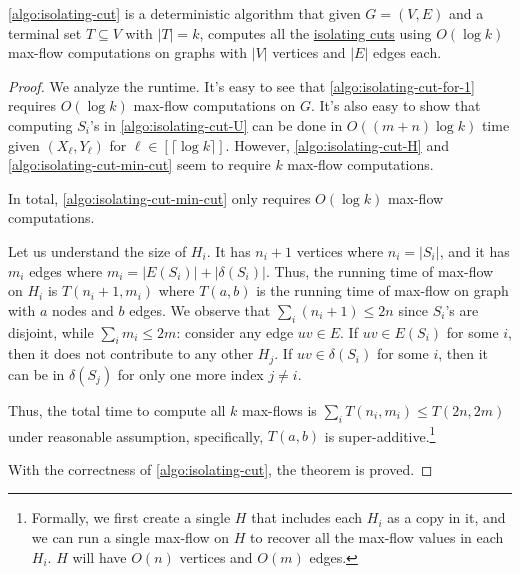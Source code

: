 \begin{theorem}\label{thm:isolating-min-cut}
	\autoref{algo:isolating-cut} is a deterministic algorithm that given \(G = (V, E)\) and a terminal set \(T \subseteq V\) with \(\lvert T \rvert = k\), computes all the \hyperref[prb:isolating-cut]{isolating cuts} using \(O(\log k)\) max-flow computations on graphs with \(\lvert V \rvert \) vertices and \(\lvert E \rvert \) edges each.
\end{theorem}
\begin{proof}
	We analyze the runtime. It's easy to see that \autoref{algo:isolating-cut-for-1} requires \(O(\log k)\) max-flow computations on \(G\). It's also easy to show that computing \(S_i\)'s in \autoref{algo:isolating-cut-U} can be done in \(O((m+n) \log k)\) time given \((X_{\ell } , Y_{\ell } )\) for \(\ell \in [\lceil \log k \rceil ]\). However, \autoref{algo:isolating-cut-H} and \autoref{algo:isolating-cut-min-cut} seem to require \(k\) max-flow computations.

	\begin{claim}
		In total, \autoref{algo:isolating-cut-min-cut} only requires \(O(\log k)\) max-flow computations.
	\end{claim}
	\begin{explanation}
		Let us understand the size of \(H_i\). It has \(n_i + 1\) vertices where \(n_i = \lvert S_i \rvert \), and it has \(m_i\) edges where \(m_i = \lvert E(S_i) \rvert + \lvert \delta (S_i) \rvert \). Thus, the running time of max-flow on \(H_i\) is \(T(n_i + 1, m_i)\) where \(T(a, b)\) is the running time of max-flow on graph with \(a\) nodes and \(b\) edges. We observe that \(\sum_{i} (n_i + 1) \leq 2n\) since \(S_i\)'s are disjoint, while \(\sum_{i} m_i \leq 2m\): consider any edge \(uv \in E\). If \(uv \in E(S_i)\) for some \(i\), then it does not contribute to any other \(H_j\). If \(uv \in \delta (S_i)\) for some \(i\), then it can be in \(\delta (S_j)\) for only one more index \(j \neq i\).

		Thus, the total time to compute all \(k\) max-flows is \(\sum_{i} T(n_i, m_i) \leq T(2n, 2m)\) under reasonable assumption, specifically, \(T(a, b)\) is super-additive.\footnote{Formally, we first create a single \(H\) that includes each \(H_i\) as a copy in it, and we can run a single max-flow on \(H\) to recover all the max-flow values in each \(H_i\). \(H\) will have \(O(n)\) vertices and \(O(m)\) edges.}
	\end{explanation}
	With the correctness of \autoref{algo:isolating-cut}, the theorem is proved.
\end{proof}

